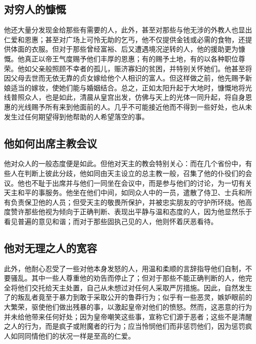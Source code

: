 
\subsection{对穷人的慷慨}

他还大量分发现金给那些有需要的人，此外，甚至对那些与他无涉的外教人也显出仁爱和恩惠；甚至对广场上可怜无助的乞丐，他不仅提供金钱或必需的食物，还提供体面的衣服。但对于那些曾经富裕、后又遭遇境况逆转的人，他的援助更为慷慨。他真正以帝王气度赐予他们丰厚的恩惠；有的赐予土地，有的以各种职位尊荣。他如父亲般照顾不幸者的孤儿，赈济寡妇的贫困，并特别关怀她们。他甚至将因父母去世而无依无靠的贞女嫁给他个人相识的富人。但这样做之前，他先赐予新娘适当的嫁妆，使她们能与婚姻结合。总之，正如太阳升起于大地时，慷慨地将光线普照众人，也是如此，清晨从皇宫出发，仿佛与天上的光体一同升起，将自身恩惠的光线赐予所有来到他面前的人。几乎不可能接近他而不得到一些好处，也从未发生过任何期望得到他帮助的人希望落空的事。\par


\subsection{他如何出席主教会议}

他对众人的一般态度便是如此。但他对天主的教会特别关心：而在几个省份中，有些人在判断上彼此分歧，他如同由天主设立的总主教一般，召集了他的仆役们的会议。他也不耻于出席并与他们一同坐在会议中，而是参与他们的讨论，为一切有关天主和平的事服务。他坐在他们中间，如同众人中的一员，遣散了侍卫、士兵和所有负责保卫他的人员；但受天主的敬畏所保护，并被忠实朋友的守护所环绕。他高度赞许那些他视为倾向于正确判断、表现出平静与温和态度的人，因为他显然乐于看见普遍的意见和谐；而对于那些固执己见的人，他则怀着厌恶看待。\par


\subsection{他对无理之人的宽容}

此外，他耐心忍受了一些对他本身发怒的人，用温和柔顺的言辞指导他们自制，不要骚乱。其中一些人尊重他的劝告而停止了；但对于那些不能正确判断的人，他完全将他们交托给天主处置，自己从未想过对任何人采取严厉措施。因此，自然发生了的叛乱者竟至于暴力到敢于采取公开的鲁莽行为；似乎有一些恶灵，嫉妒眼前的大繁荣，驱使他们做出残暴的事，以激起皇帝对他们的愤怒。然而，这恶意的行为并未给他带来任何好处；因为皇帝嘲笑这些事，宣称它们源于恶者；这些不是清醒之人的行为，而是疯子或附魔者的行为；应当怜悯他们而非惩罚他们，因为惩罚疯人如同同情他们的状况一样是至高的仁爱。\par

